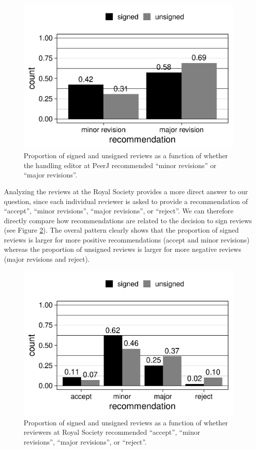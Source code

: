 \documentclass[,jou, a4paper,floatsintext]{apa6}
\begin{document}
\begin{figure}
\centering
\includegraphics{open_peer_review_files/figure-latex/PeerJrec-1.pdf}
\caption{\label{fig:PeerJrec}Proportion of signed and unsigned reviews as a function of whether the handling editor at PeerJ recommended \enquote{minor revisions} or \enquote{major revisions}.}
\end{figure}

Analyzing the reviews at the Royal Society provides a more direct answer to our question, since each individual reviewer is asked to provide a recommendation of \enquote{accept}, \enquote{minor revisions}, \enquote{major revisions}, or \enquote{reject}. We can therefore directly compare how recommendations are related to the decision to sign reviews (see Figure \ref{fig:TRSrec}). The overal pattern clearly shows that the proportion of signed reviews is larger for more positive recommendations (accept and minor revisions) whereas the proportion of unsigned reviews is larger for more negative reviews (major revisions and reject).

\begin{figure}
\centering
\includegraphics{open_peer_review_files/figure-latex/TRSrec-1.pdf}
\caption{\label{fig:TRSrec}Proportion of signed and unsigned reviews as a function of whether reviewers at Royal Society recommended \enquote{accept}, \enquote{minor revisions}, \enquote{major revisions}, or \enquote{reject}.}
\end{figure}
\end{document}
